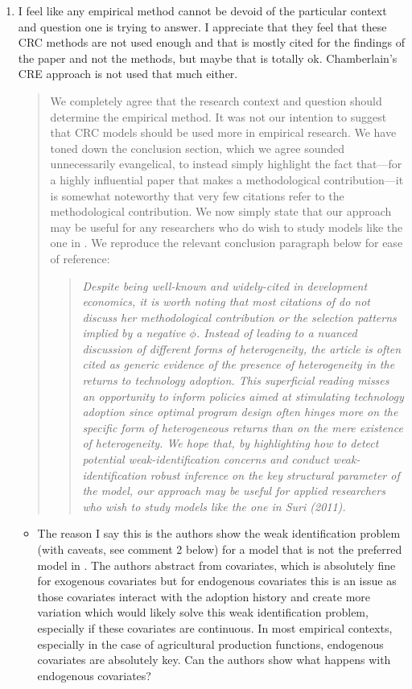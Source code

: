 \documentclass{article}[11pt]
\begin{document}
\begin{enumerate}
  \item I feel like any empirical method cannot be devoid of the particular context and question one is trying to answer. I appreciate that they feel that these CRC methods are not used enough and that \citet{S2011} is mostly cited for the findings of the paper and not the methods, but maybe that is totally ok. Chamberlain’s CRE approach is not used that much either.  
    \begin{quote}
    We completely agree that the research context and question should determine the empirical method. It was not our intention to suggest that CRC models should be used more in empirical research. 
    We have toned down the conclusion section, which we agree sounded unnecessarily evangelical, to instead simply highlight the fact that---for a highly influential paper that makes a methodological contribution---it is somewhat noteworthy that very few citations refer to the methodological contribution.  
    We now simply state that our approach may be useful for any researchers who do wish to study models like the one in \citet{S2011}.
    We reproduce the relevant conclusion paragraph below for ease of reference:
    \begin{quote}
        \textit{Despite being well-known and widely-cited in development economics, it is worth noting that most citations of \citet{S2011} do not discuss her methodological contribution or the selection patterns implied by a negative $\phi$. 
        Instead of leading to a nuanced discussion of different forms of heterogeneity, the article is often cited as generic evidence of the presence of heterogeneity in the returns to technology adoption. 
        This superficial reading misses an opportunity to inform policies aimed at stimulating technology adoption since optimal program design often hinges more on the specific form of heterogeneous returns than on the mere existence of heterogeneity. 
        We hope that, by highlighting how to detect potential weak-identification concerns and conduct weak-identification robust inference on the key structural parameter of the model, our approach may be useful for applied researchers who wish to study models like the one in Suri (2011).}
    \end{quote}
\end{quote}
  \begin{itemize}
      \item[(a)] The reason I say this is the authors show the weak identification problem (with caveats, see comment 2 below) for a model that is not the preferred model in \citet{S2011}. The authors abstract from covariates, which is absolutely fine for exogenous covariates but for endogenous covariates this is an issue as those covariates interact with the adoption history and create more variation which would likely solve this weak identification problem, especially if these covariates are continuous. In most empirical contexts, especially in the case of agricultural production functions, endogenous covariates are absolutely key. Can the authors show what happens with endogenous covariates?

\end{itemize}
\end{enumerate}
\end{document}
